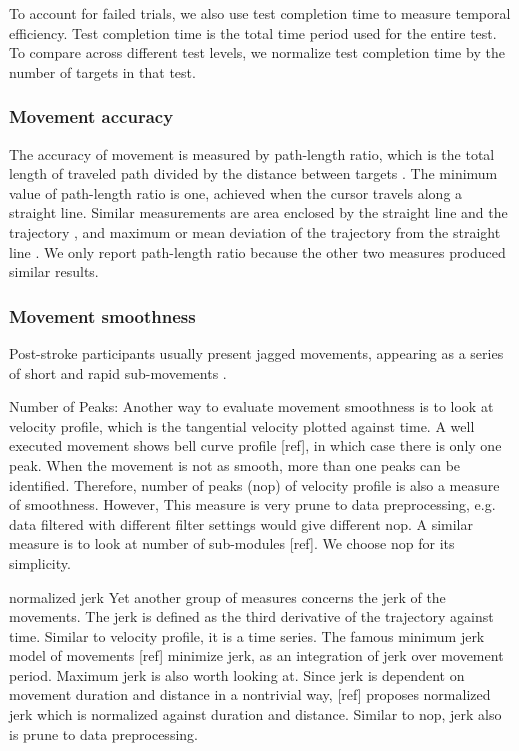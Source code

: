 To account for failed trials, we also use test completion time to measure temporal efficiency. 
Test completion time is the total time period used for the entire test.
To compare across different test levels, we normalize test completion time by the number of targets in that test.

\subsubsection{Movement accuracy}
The accuracy of movement is measured by path-length ratio, which is the total length of traveled path divided by the distance between targets \cite{Cirstea2000}. 
The minimum value of path-length ratio is one, achieved when the cursor travels along a straight line. 
Similar measurements are area enclosed by the straight line and the trajectory \cite{Kim16 from Nordin2014}, and maximum or mean deviation of the trajectory from the straight line \cite{Colombo61 from Nordin2014}. 
We only report path-length ratio because the other two measures produced similar results.



\subsubsection{Movement smoothness}
Post-stroke participants usually present jagged movements, appearing as a series of short and rapid sub-movements \cite{Rohrer1 from Nordin2014}.

Number of Peaks:
Another way to evaluate movement smoothness is to look at velocity profile, which is the tangential velocity plotted against time. 
A well executed movement shows bell curve profile [ref], in which case there is only one peak. 
When the movement is not as smooth, more than one peaks can be identified. 
Therefore, number of peaks (nop) of velocity profile is also a measure of smoothness. 
However, This measure is very prune to data preprocessing, e.g. data filtered with different filter settings would give different nop. 
A similar measure is to look at number of sub-modules [ref]. We choose nop for its simplicity.

normalized jerk
Yet another group of measures concerns the jerk of the movements. 
The jerk is defined as the third derivative of the trajectory against time. 
Similar to velocity profile, it is a time series. 
The famous minimum jerk model of movements [ref] minimize jerk, as an integration of jerk over movement period. 
Maximum jerk is also worth looking at. 
Since jerk is dependent on movement duration and distance in a nontrivial way, [ref] proposes normalized jerk which is normalized against duration and distance. 
Similar to nop, jerk also is prune to data preprocessing.

